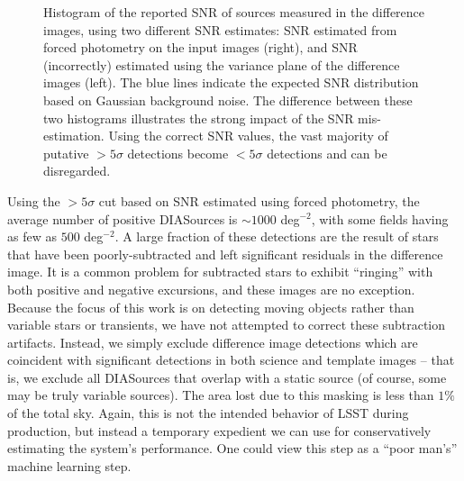 \begin{figure}
  \centering
  \caption{
  Histogram of the reported SNR of sources measured in the difference images, 
  using two different SNR estimates: SNR estimated from forced photometry on
  the input images (right), and SNR (incorrectly) estimated using the variance plane
  of the difference images (left). The blue lines indicate the expected SNR distribution
  based on Gaussian background noise. The difference between these two histograms
  illustrates the strong impact of the SNR mis-estimation. Using the correct SNR values, 
  the vast majority of putative $>5 \sigma$ detections become $<5 \sigma$ detections
  and can be disregarded.
  }
  \label{fig:snr_comparison}
\end{figure}


Using the $>5\sigma$ cut based on SNR estimated using forced photometry, 
the average number of positive DIASources is $\sim 1000$ deg$^{-2}$,
with some fields having as few as $500$ deg$^{-2}$. A large fraction of
these detections are the result of stars that have been poorly-subtracted and
left significant residuals in the difference image. It is a common problem for
subtracted stars to exhibit ``ringing'' with both positive and negative
excursions, and these images are no exception. Because the focus of this work
is on detecting moving objects rather than variable stars or transients, we have
not attempted to correct these subtraction artifacts. Instead, we simply exclude
difference image detections which are coincident with significant detections in
both science and template images -- that is, we exclude all DIASources that
overlap with a static source (of course, some may be truly variable sources). 
The area lost due to this masking is less than $1\%$ of the total sky. Again, this 
is not the intended behavior of LSST during production, but instead a temporary 
expedient we can use for conservatively estimating the system's performance. 
One could view this step as a ``poor man's'' machine learning step. 


